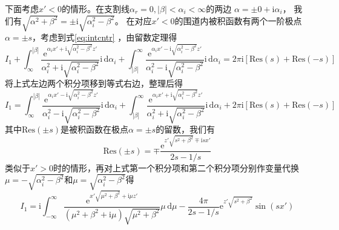 下面考虑$x'<0$的情形。在支割线$\alpha_r=0,|\beta|<\alpha_i<\infty$的两边
$\alpha=\pm 0+\mathrm{i}\alpha_i$，
我们有$\sqrt{\alpha^2+\beta^2}=\pm\mathrm{i}\sqrt{\alpha_i^2-\beta^2}$。
在对应$x'<0$的围道内被积函数有两个一阶极点$\alpha=\pm s$，考虑到式\eqref{eq:intcntr}
，由留数定理得
\begin{equation*}
  I_1+\int_{\infty}^{|\beta|}
  \frac{\mathrm{e}^{\alpha_i x'+\mathrm{i}\sqrt{\alpha_i^2-\beta^2}z'}}{\alpha_i^2+
    \mathrm{i}\sqrt{\alpha_i^2-\beta^2}}\mathrm{i}\,\mathrm{d}\alpha_i
  +\int_{|\beta|}^{\infty}
  \frac{\mathrm{e}^{\alpha_i x'-\mathrm{i}\sqrt{\alpha_i^2-\beta^2}z'}}{\alpha_i^2-
    \mathrm{i}\sqrt{\alpha_i^2-\beta^2}}\mathrm{i}\,\mathrm{d}\alpha_i=
    2\pi\mathrm{i}[\mathrm{Res}(s)+\mathrm{Res}(-s)]
\end{equation*}
将上式左边两个积分项移到等式右边，整理后得
\begin{equation*}
  I_1=\int_{\infty}^{|\beta|}
  \frac{\mathrm{e}^{\alpha_i x'-\mathrm{i}\sqrt{\alpha_i^2-\beta^2}z'}}{\alpha_i^2-
    \mathrm{i}\sqrt{\alpha_i^2-\beta^2}}\mathrm{i}\,\mathrm{d}\alpha_i
  +\int_{|\beta|}^{\infty}
  \frac{\mathrm{e}^{\alpha_i x'+\mathrm{i}\sqrt{\alpha_i^2-\beta^2}z'}}{\alpha_i^2+
    \mathrm{i}\sqrt{\alpha_i^2-\beta^2}}\mathrm{i}\,\mathrm{d}\alpha_i+
    2\pi\mathrm{i}[\mathrm{Res}(s)+\mathrm{Res}(-s)]
\end{equation*}
其中$\mathrm{Res}(\pm s)$是被积函数在极点$\alpha=\pm s$的留数，我们有
\begin{equation*}
  \mathrm{Res}(\pm s)=\mp\frac{\mathrm{e}^{z'\sqrt{s^2+\beta^2}\mp\mathrm{i}sx'}}{2s-1/s}
\end{equation*}
类似于$x'>0$时的情形，再对上式第一个积分项和第二个积分项分别作变量代换
$\mu=-\sqrt{\alpha_i^2-\beta^2}$和$\mu=\sqrt{\alpha_i^2-\beta^2}$得
\begin{equation}
  I_1=\mathrm{i}\int_{-\infty}^{\infty}
  \frac{\mathrm{e}^{x'\sqrt{\mu^2+\beta^2}+\mathrm{i}\mu z'}}{(\mu^2+\beta^2+\mathrm{i}\mu)\sqrt{\mu^2+\beta^2}}\mu\,\mathrm{d}\mu-\frac{4\pi}{2s-1/s}\mathrm{e}^
  {z'\sqrt{s^2+\beta^2}}\sin(sx')
  \label{eq:I1mu-b}
\end{equation}

